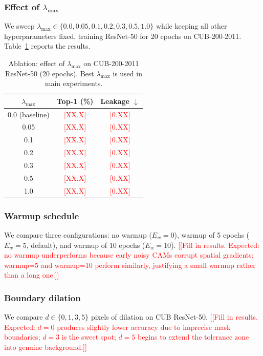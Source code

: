 \documentclass[journal]{IEEEtran}
\newcommand{\ph}[1]{\textcolor{red}{[#1]}}
\begin{document}
\subsubsection{Effect of $\lambda_{\max}$}
We sweep $\lambda_{\max} \in \{0.0, 0.05, 0.1, 0.2, 0.3, 0.5, 1.0\}$
while keeping all other hyperparameters fixed, training ResNet-50
for 20 epochs on CUB-200-2011. Table~\ref{tab:lambda} reports the
results.

\begin{table}[htbp]
  \centering
  \caption{Ablation: effect of $\lambda_{\max}$ on CUB-200-2011
           ResNet-50 (20 epochs). Best $\lambda_{\max}$ is used in
           main experiments.}
  \label{tab:lambda}
  \renewcommand{\arraystretch}{1.2}
  \begin{tabular}{c c c}
    \toprule
    $\lambda_{\max}$ & Top-1 (\%) & Leakage $\downarrow$ \\
    \midrule
    0.0 (baseline) & \ph{XX.X} & \ph{0.XX} \\
    0.05           & \ph{XX.X} & \ph{0.XX} \\
    0.1            & \ph{XX.X} & \ph{0.XX} \\
    0.2            & \ph{XX.X} & \ph{0.XX} \\
    0.3            & \ph{XX.X} & \ph{0.XX} \\
    0.5            & \ph{XX.X} & \ph{0.XX} \\
    1.0            & \ph{XX.X} & \ph{0.XX} \\
    \bottomrule
  \end{tabular}
\end{table}

\subsubsection{Warmup schedule}
We compare three configurations: no warmup ($E_w = 0$),
warmup of 5 epochs ($E_w = 5$, default), and warmup of 10 epochs
($E_w = 10$). \ph{[Fill in results. Expected: no warmup
underperforms because early noisy CAMs corrupt spatial gradients;
warmup=5 and warmup=10 perform similarly, justifying a small
warmup rather than a long one.]}

\subsubsection{Boundary dilation}
We compare $d \in \{0, 1, 3, 5\}$ pixels of dilation on CUB
ResNet-50. \ph{[Fill in results. Expected: $d = 0$ produces
slightly lower accuracy due to imprecise mask boundaries; $d = 3$
is the sweet spot; $d = 5$ begins to extend the tolerance zone
into genuine background.]}
\end{document}
